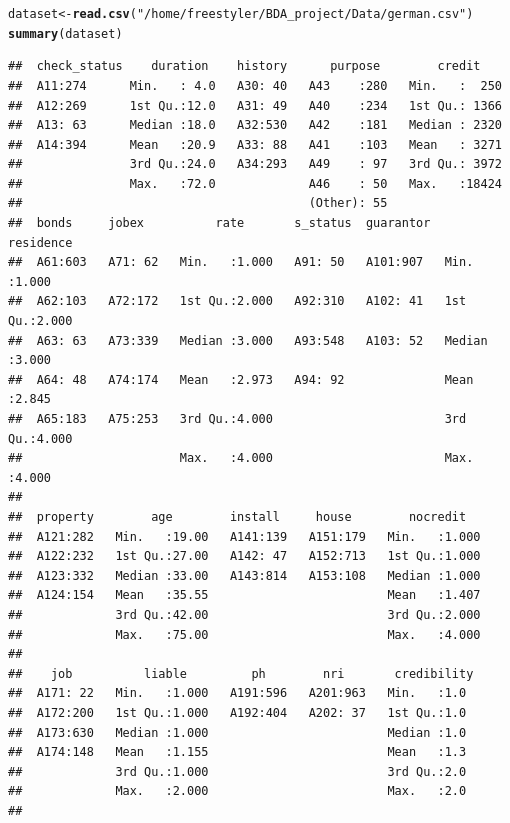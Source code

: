 \documentclass{article}\usepackage[]{graphicx}\usepackage[]{color}
\makeatletter
\newcommand{\hlstr}[1]{\textcolor[rgb]{0.192,0.494,0.8}{#1}}%
\newcommand{\hlstd}[1]{\textcolor[rgb]{0.345,0.345,0.345}{#1}}%
\newcommand{\hlkwb}[1]{\textcolor[rgb]{0.69,0.353,0.396}{#1}}%
\newcommand{\hlkwd}[1]{\textcolor[rgb]{0.737,0.353,0.396}{\textbf{#1}}}%
\newenvironment{kframe}{%
 \def\at@end@of@kframe{}%
 \ifinner\ifhmode%
  \def\at@end@of@kframe{\end{minipage}}%
  \begin{minipage}{\columnwidth}%
 \fi\fi%
 \def\FrameCommand##1{\hskip\@totalleftmargin \hskip-\fboxsep
 \colorbox{shadecolor}{##1}\hskip-\fboxsep
     \hskip-\linewidth \hskip-\@totalleftmargin \hskip\columnwidth}%
 \MakeFramed {\advance\hsize-\width
   \@totalleftmargin\z@ \linewidth\hsize
   \@setminipage}}%
 {\par\unskip\endMakeFramed%
 \at@end@of@kframe}
\newenvironment{knitrout}{}{} %
\makeatother
\begin{document}
\begin{knitrout}
\color{fgcolor}\begin{kframe}
\begin{alltt}
\hlstd{dataset}\hlkwb{<-}\hlkwd{read.csv}\hlstd{(}\hlstr{"/home/freestyler/BDA_project/Data/german.csv"}\hlstd{)}
\hlkwd{summary}\hlstd{(dataset)}
\end{alltt}
\begin{verbatim}
##  check_status    duration    history      purpose        credit     
##  A11:274      Min.   : 4.0   A30: 40   A43    :280   Min.   :  250  
##  A12:269      1st Qu.:12.0   A31: 49   A40    :234   1st Qu.: 1366  
##  A13: 63      Median :18.0   A32:530   A42    :181   Median : 2320  
##  A14:394      Mean   :20.9   A33: 88   A41    :103   Mean   : 3271  
##               3rd Qu.:24.0   A34:293   A49    : 97   3rd Qu.: 3972  
##               Max.   :72.0             A46    : 50   Max.   :18424  
##                                        (Other): 55                  
##  bonds     jobex          rate       s_status  guarantor    residence    
##  A61:603   A71: 62   Min.   :1.000   A91: 50   A101:907   Min.   :1.000  
##  A62:103   A72:172   1st Qu.:2.000   A92:310   A102: 41   1st Qu.:2.000  
##  A63: 63   A73:339   Median :3.000   A93:548   A103: 52   Median :3.000  
##  A64: 48   A74:174   Mean   :2.973   A94: 92              Mean   :2.845  
##  A65:183   A75:253   3rd Qu.:4.000                        3rd Qu.:4.000  
##                      Max.   :4.000                        Max.   :4.000  
##                                                                          
##  property        age        install     house        nocredit    
##  A121:282   Min.   :19.00   A141:139   A151:179   Min.   :1.000  
##  A122:232   1st Qu.:27.00   A142: 47   A152:713   1st Qu.:1.000  
##  A123:332   Median :33.00   A143:814   A153:108   Median :1.000  
##  A124:154   Mean   :35.55                         Mean   :1.407  
##             3rd Qu.:42.00                         3rd Qu.:2.000  
##             Max.   :75.00                         Max.   :4.000  
##                                                                  
##    job          liable         ph        nri       credibility 
##  A171: 22   Min.   :1.000   A191:596   A201:963   Min.   :1.0  
##  A172:200   1st Qu.:1.000   A192:404   A202: 37   1st Qu.:1.0  
##  A173:630   Median :1.000                         Median :1.0  
##  A174:148   Mean   :1.155                         Mean   :1.3  
##             3rd Qu.:1.000                         3rd Qu.:2.0  
##             Max.   :2.000                         Max.   :2.0  
## 
\end{verbatim}
\end{kframe}
\end{knitrout}
\end{document}
